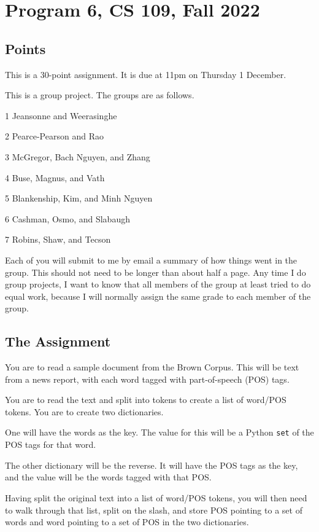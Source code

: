 \section*{Program 6, CS 109, Fall 2022}
\newcommand{\PI}{$\pi$}

\subsection*{Points}
This is a 30-point assignment.
It is due at 11pm on Thursday 1 December.

This is a group project.
The groups are as follows.

1 Jeansonne and Weerasinghe

2 Pearce-Pearson and Rao

3 McGregor, Bach Nguyen, and Zhang

4 Buse, Magnus, and Vath

5 Blankenship, Kim, and Minh Nguyen

6 Cashman, Osmo, and Slabaugh

7 Robins, Shaw, and Tecson

Each of you will submit to me by email a summary of how things went
in the group.
This should not need to be longer than about half a page.
Any time I do group projects, I want to know that all members of the group
at least tried to do equal work, because I will normally assign the same
grade to each member of the group. 

\subsection*{The Assignment}
You are to read a sample document from the Brown Corpus.
This will be text from a news report, with each word tagged with
part-of-speech (POS) tags.

You are to read the text and split into tokens to create a list
of word/POS tokens.
You are to create two dictionaries.

One will have the words as the key.
The value for this will be a Python {\tt set} of the POS tags for that word. 

The other dictionary will be the reverse.
It will have the POS tags as the key, and the value will be the words
tagged with that POS.

Having split the original text into a list of word/POS tokens, you will
then need to walk through that list, split on the slash, and store
POS pointing to a set of words and word pointing to a set of POS in
the two dictionaries.

